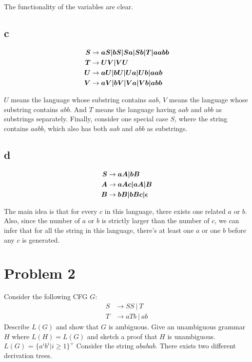 \documentclass[a4paper,UTF8]{ctexart}
\theoremstyle{definition}
\begin{document}
The functionality of the variables are clear.

\subsection*{c}
\begin{alignat*}{2}
	\boldsymbol{S} &\rightarrow \boldsymbol{aS|bS|Sa|Sb|T|aabb} \\
	\boldsymbol{T} &\rightarrow \boldsymbol{UV|VU}              \\
	\boldsymbol{U} &\rightarrow \boldsymbol{aU|bU|Ua|Ub|aab}    \\
	\boldsymbol{V} &\rightarrow \boldsymbol{aV|bV|Va|Vb|abb}
\end{alignat*}

$U$ means the language whose substring contains $aab$,
$V$ means the language whose substring contains $abb$.
And $T$ means the language having $aab$ and $abb$ as substrings separately.
Finally, consider one special case $S$, where the string contains $aabb$, which also has both
$aab$ and $abb$ as substrings.

\subsection*{d}

\begin{alignat*}{2}
	\boldsymbol{S} &\rightarrow \boldsymbol{aA|bB}           \\
	\boldsymbol{A} &\rightarrow \boldsymbol{aAc|aA|B}        \\
	\boldsymbol{B} &\rightarrow \boldsymbol{bB|bBc|\epsilon}
\end{alignat*}

The main idea is that for every $c$ in this language, there exists one related $a$ or $b$. Also, 
since the number of $a$ or $b$ is strictly larger than the number of $c$, we can infer that for all the 
string in this language, there's at least one $a$ or one $b$ before any $c$ is generated.
\section*{Problem 2}
Consider the following CFG $G$:
\[
	\begin{aligned}
		S & \rightarrow SS\ |\ T   \\
		T & \rightarrow aTb\ |\ ab
	\end{aligned}
\]
Describe $L(G)$ and show that $G$ is ambiguous. Give an unambiguous grammar $H$
where $L(H) = L(G)$ and sketch a proof that $H$ is unambiguous.
\\

$L(G)$ = $\{a^ib^i|i\geq 1\}^+$
Consider the string $ababab$. There exists two different derivation trees.
\end{document}
